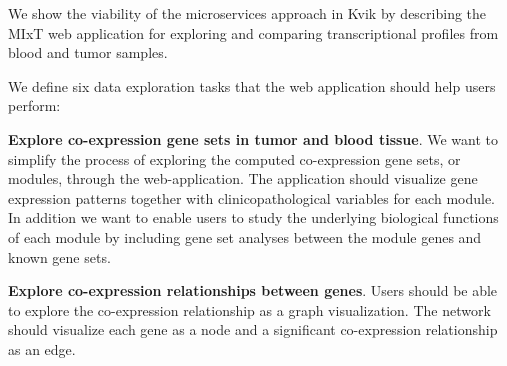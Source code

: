 %
%
We show the viability of the microservices approach in Kvik by describing the
MIxT web application for exploring and comparing
transcriptional profiles from blood and tumor samples. 




We define six data exploration tasks that the web application should help users
perform: 

\textbf{Explore co-expression gene sets in tumor and blood tissue}. We want to
simplify the process of exploring the computed co-expression gene sets, or
modules, through the web-application. The application should 
visualize gene expression patterns together with clinicopathological variables
for each module. In addition we want to enable users to study the underlying
biological functions of each module by including gene set analyses between the
module genes and known gene sets. 

\textbf{Explore co-expression relationships between genes}. Users should be able
to explore the co-expression relationship as a graph visualization. The network
should visualize each gene as a node and a significant co-expression
relationship as an edge.  

